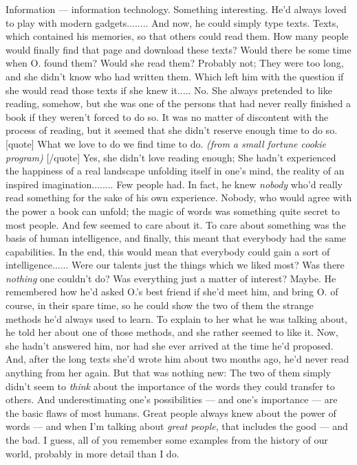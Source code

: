 Information --- information technology. Something interesting. He'd always loved to play with modern gadgets........
And now, he could simply type texts. Texts, which contained his memories, so that others could read them. How many people would finally find that page and download these texts?
Would there be some time when O. found them?
Would she read them?
Probably not; They were too long, and she didn't know who had written them. Which left him with the question if she would read those texts if she knew it.....
No. She always pretended to like reading, somehow, but she was one of the persons that had never really finished a book if they weren't forced to do so. It was no matter of discontent with the process of reading, but it seemed that she didn't reserve enough time to do so. 
[quote]
What we love to do we find time to do. 
\emph{(from a small fortune cookie program)}
[/quote]
Yes, she didn't love reading enough; She hadn't experienced the happiness of a real landscape unfolding itself in one's mind, the reality of an inspired imagination........
Few people had. 
In fact, he knew \emph{nobody} who'd really read something for the sake of his own experience. 
Nobody, who would agree with the power a book can unfold; the magic of words was something quite secret to most people. 
And few seemed to care about it. 
To care about something was the basis of human intelligence, and finally, this meant that everybody had the same capabilities. In the end, this would mean that everybody could gain a sort of intelligence......
Were our talents just the things which we liked most?
Was there \emph{nothing} one couldn't do?
Was everything just a matter of interest?
Maybe. He remembered how he'd asked O.'s best friend if she'd meet him, and bring O. of course, in their spare time, so he could show the two of them the strange methods he'd always used to learn. To explain to her what he was talking about, he told her about one of those methods, and she rather seemed to like it. 
Now, she hadn't answered him, nor had she ever arrived at the time he'd proposed. 
And, after the long texts she'd wrote him about two months ago, he'd never read anything from her again. 
But that was nothing new: The two of them simply didn't seem to \emph{think} about the importance of the words they could transfer to others. And underestimating one's possibilities --- and one's importance --- are the basic flaws of most humans. 
Great people always knew about the power of words --- and when I'm talking about \emph{great people}, that includes the good --- and the bad. 
I guess, all of you remember some examples from the history of our world, probably in more detail than I do. 
